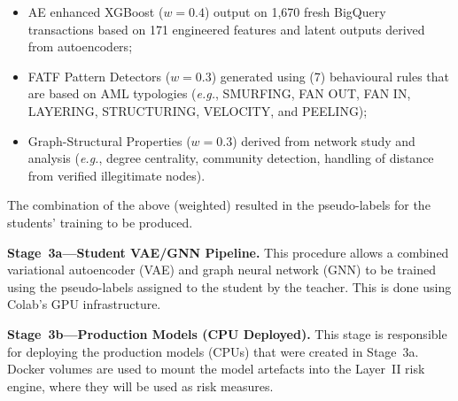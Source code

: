 \documentclass[journal]{IEEEtran}
\newcommand{\eg}{\textit{e.g.}}
\begin{document}
\begin{itemize}
\item AE enhanced XGBoost ($w=0.4$) output on 1,670 fresh BigQuery transactions based on 171 engineered features and latent outputs derived from autoencoders;
\item FATF Pattern Detectors ($w=0.3$) generated using (7) behavioural rules that are based on AML typologies (\eg, SMURFING, FAN OUT, FAN IN, LAYERING, STRUCTURING, VELOCITY, and PEELING);
\item Graph-Structural Properties ($w=0.3$) derived from network study and analysis (\eg, degree centrality, community detection, handling of distance from verified illegitimate nodes).
\end{itemize}

The combination of the above (weighted) resulted in the pseudo-labels for the students' training to be produced.

\textbf{Stage~3a---Student VAE/GNN Pipeline.} This procedure allows a combined variational autoencoder (VAE) and graph neural network (GNN) to be trained using the pseudo-labels assigned to the student by the teacher. This is done using Colab's GPU infrastructure.

\textbf{Stage~3b---Production Models (CPU Deployed).} This stage is responsible for deploying the production models (CPUs) that were created in Stage~3a. Docker volumes are used to mount the model artefacts into the Layer~II risk engine, where they will be used as risk measures.
\end{document}
